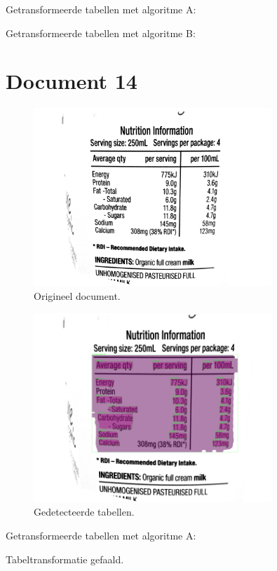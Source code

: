 Getransformeerde tabellen met algoritme A:

Getransformeerde tabellen met algoritme B:
\section{Document 14}

\begin{figure}[H]
    \centering
    \includegraphics[width=0.8\textwidth]{test-resultaten/14/original_b/original.png}
    \caption{Origineel document.}
\end{figure}

\begin{figure}[H]
    \centering
    \includegraphics[width=0.8\textwidth]{test-resultaten/14/original_b/detected_tables.png}
    \caption{Gedetecteerde tabellen.}
\end{figure}

Getransformeerde tabellen met algoritme A:

Tabeltransformatie gefaald.

